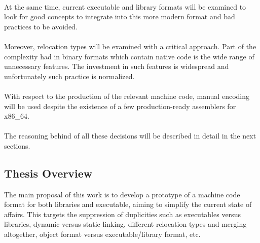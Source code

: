 \documentclass[12pt]{article}
\begin{document}
    \paragraph{}At the same time, current executable and library formats will be examined to look for good concepts to integrate into this more modern format and bad practices to be avoided.
    
    \paragraph{}Moreover, relocation types will be examined with a critical approach. Part of the complexity had in binary formats which contain native code is the wide range of unnecessary features. The investment in such features is widespread and unfortunately such practice is normalized.
    
    \paragraph{} With respect to the production of the relevant machine code, manual encoding will be used despite the existence of a few production-ready assemblers for x86\_64. 
    
    \paragraph{} The reasoning behind of all these decisions will be described in detail in the next sections.

%	

	\subsection{Thesis Overview}
	The main proposal of this work is to develop a prototype of a machine code format for both libraries and executable, aiming to simplify the current state of affairs. This targets the suppression of duplicities such as executables versus libraries, dynamic versus static linking, different relocation types and merging altogether, object format versus executable/library format, etc.
	
\end{document}
